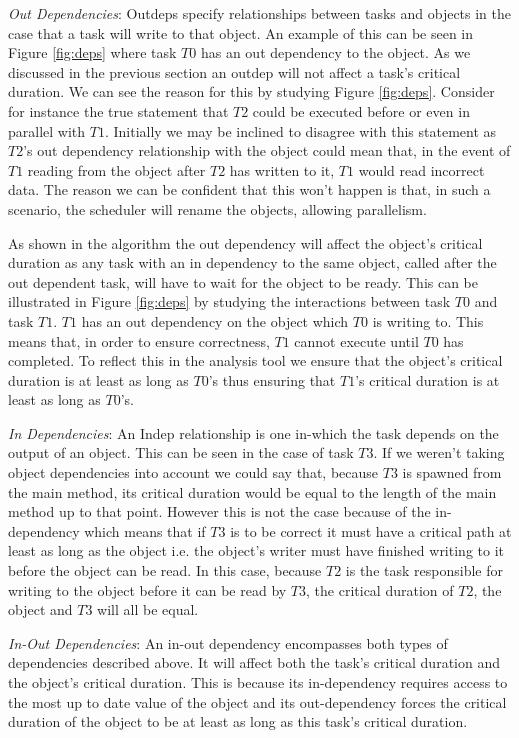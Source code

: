 \begin{itemize}
\begin{item}
\emph{Out Dependencies}:  %
Outdeps specify relationships between tasks and objects in the case that a task will write to that object. An example of this can be seen in Figure \ref{fig:deps} where task \(T0\) has an out dependency to the object. As we discussed in the previous section an outdep will not affect a task's critical duration. We can see the reason for this by studying Figure \ref{fig:deps}.  Consider for instance the true statement that \(T2\) could be executed before or even in parallel with \(T1\). Initially we may be inclined to disagree with this statement as \(T2\)'s out dependency relationship with the object could mean that, in the event of \(T1\) reading from the object after \(T2\) has written to it, \(T1\) would read incorrect data. The reason we can be confident that this won't happen is that, in such a scenario, the scheduler will rename the objects, allowing parallelism. 

As shown in the algorithm the out dependency will affect the object's critical duration as any task with an in dependency to the same object, called after the out dependent task, will have to wait for the object to be ready. This can be illustrated in Figure \ref{fig:deps} by studying the interactions between task \(T0\) and task \(T1\). \(T1\) has an out dependency on the object which \(T0\) is writing to. This means that, in order to ensure correctness, \(T1\) cannot execute until \(T0\) has completed. To reflect this in the analysis tool we ensure that the object's critical duration is at least as long as \(T0\)'s thus ensuring that \(T1\)'s critical duration is at least as long as \(T0\)'s.
\end{item}
\begin{item}
\emph{In Dependencies}: 
An Indep relationship is one in-which the task depends on the output of an object. This can be seen in the case of task \(T3\). If we weren't taking object dependencies into account we could say that, because \(T3\) is spawned from the main method, its critical duration would be equal to the length of the main method up to that point. However this is not the case because of the in-dependency which means that if \(T3\) is to be correct it must have a critical path at least as long as the object i.e. the object's writer must have finished writing to it before the object can be read. In this case, because \(T2\) is the task responsible for writing to the object before it can be read by \(T3\), the critical duration of \(T2\), the object and \(T3\) will all be equal.
\end{item}

\begin{item}
\emph{In-Out Dependencies}: 
An in-out dependency encompasses both types of dependencies described above. It will affect both the task's critical duration and the object's critical duration. This is because its in-dependency requires access to the most up to date value of the object and its out-dependency forces the critical duration of the object to be at least as long as this task's critical duration.
\end{item}
\end{itemize}
